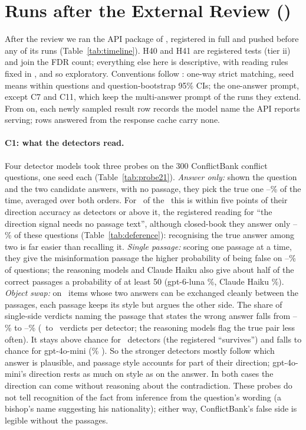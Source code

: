 \clearpage
\section{Runs after the External Review ()}
\label{app:rev21}
After the review we ran the API package of , registered in full and pushed before any of its runs
(Table~\ref{tab:timeline}). H40 and H41 are registered tests (tier ii) and join the FDR count; everything else here
is descriptive, with reading rules fixed in , and so exploratory. Conventions follow : one-way strict
matching, seed means within questions and question-bootstrap 95\% CIs; the one-answer prompt, except C7 and C11, which
keep the multi-answer prompt of the runs they extend. From  on, each newly
sampled result row records the model name the API reports serving; rows answered from the response cache carry none.


\paragraph{C1: what the detectors read.} Four detector models took three probes on the 300 ConflictBank conflict
questions, one seed each (Table~\ref{tab:probe21}). \emph{Answer only:} shown the question and the two candidate
answers, with no passage, they pick the true one \cxAoMin--\cxAoMax\% of the time, averaged over both orders. For
\cxAoAboveDirN\ of the \cxProbeN\ this is within five points of their direction accuracy as detectors or above it,
the registered reading for ``the direction signal needs no passage text'', although closed-book they answer only
\cxClosedProbeMin--\cxClosedProbeMax\% of these questions (Table~\ref{tab:deference}): recognising the true answer among two is
far easier than recalling it. \emph{Single passage:} scoring one passage at a time, they give the
misinformation passage the higher probability of being false on \cxSpMin--\cxSpMax\% of questions; the reasoning
models and Claude Haiku also give about half of the correct passages a probability of at least 50 (gpt-6-luna
\cxSpCorLuna\%, Claude Haiku \cxSpCorHaiku\%). \emph{Object swap:} on \cxSwapN\ items whose two answers can be
exchanged cleanly between the passages, each passage keeps its style but argues the other side. The share of
single-side verdicts naming the passage that states the wrong answer falls from \cxSwapBeforeMin--\cxSwapBeforeMax\%
to \cxSwapMin--\cxSwapMax\% (\cxSwapVerdictsMin\ to \cxSwapVerdictsMax\ verdicts per detector; the reasoning models flag
the true pair less often). It stays above chance for \cxSwapSurviveN\ detectors (the registered ``survives'') and
falls to chance for gpt-4o-mini (\cxSwapMini\% \cxSwapMiniCI). So the stronger detectors mostly follow which answer
is plausible, and passage style accounts for part of their direction; gpt-4o-mini's direction rests as much on
style as on the answer. In both cases the direction can come without reasoning about the contradiction. These probes do not tell recognition of
the fact from inference from the question's wording (a bishop's name suggesting his nationality); either way,
ConflictBank's false side is legible without the passages.

